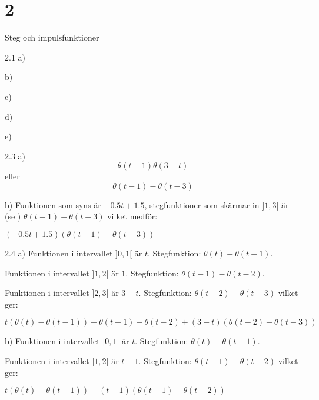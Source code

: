 \chapter{2}{Steg och impulsfunktioner}
\begin{task}{2.1 a)}
\end{task}

\begin{task}{b)}
\end{task}

\begin{task}{c)}
\end{task}

\begin{task}{d)}
\end{task}

\begin{task}{e)}
\end{task}

\begin{task}{2.2}
\end{task}

\begin{task}{2.3 a)}
	\[\theta(t-1)\theta(3-t)\]
	eller
	\[\theta(t-1)-\theta(t-3)\]
\end{task}

\begin{task}{b)}
	Funktionen som syns är $-0.5t+1.5$, stegfunktioner som skärmar in $]1,3[$ är (se ) $\theta(t-1)-\theta(t-3)$ vilket medför:
	
	\ans $(-0.5t+1.5)(\theta(t-1)-\theta(t-3))$
\end{task}

\begin{task}{2.4 a)}
	Funktionen i intervallet $]0,1[$ är $t$. Stegfunktion: $\theta(t)-\theta(t-1)$.
	
	Funktionen i intervallet $]1,2[$ är $1$. Stegfunktion: $\theta(t-1)-\theta(t-2)$.
	
	Funktionen i intervallet $]2,3[$ är $3-t$. Stegfunktion: $\theta(t-2)-\theta(t-3)$ vilket ger:
	
	\ans $t(\theta(t)-\theta(t-1))+\theta(t-1)-\theta(t-2)+(3-t)(\theta(t-2)-\theta(t-3))$
\end{task}

\begin{task}{b)}
	Funktionen i intervallet $]0,1[$ är $t$. Stegfunktion: $\theta(t)-\theta(t-1)$.
	
	Funktionen i intervallet $]1,2[$ är $t-1$. Stegfunktion: $\theta(t-1)-\theta(t-2)$ vilket ger:
	
	\ans $t(\theta(t)-\theta(t-1))+(t-1)(\theta(t-1)-\theta(t-2))$
\end{task}

